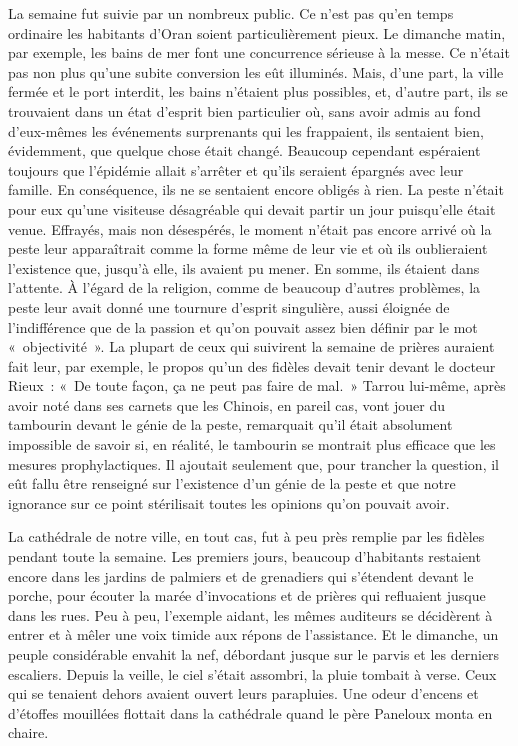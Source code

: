 \documentclass[french,twoside]{book} %
\begin{document}
La semaine fut suivie par un nombreux public. Ce n’est pas qu’en temps ordinaire les habitants d’Oran soient particulièrement pieux. Le dimanche matin, par exemple, les bains de mer font une concurrence sérieuse à la messe. Ce n’était pas non plus qu’une subite conversion les eût illuminés. Mais, d’une part, la ville fermée et le port interdit, les bains n’étaient plus possibles, et, d’autre part, ils se trouvaient dans un état d’esprit bien particulier où, sans avoir admis au fond d’eux-mêmes les événements surprenants qui les frappaient, ils sentaient bien, évidemment, que quelque chose était changé. Beaucoup cependant espéraient toujours que l’épidémie allait s’arrêter et qu’ils seraient épargnés avec leur famille. En conséquence, ils ne se sentaient encore obligés à rien. La peste n’était pour eux qu’une visiteuse désagréable qui devait partir un jour puisqu’elle était venue. Effrayés, mais non désespérés, le moment n’était pas encore arrivé où la peste leur apparaîtrait comme la forme même de leur vie et où ils oublieraient l’existence que, jusqu’à elle, ils avaient pu mener. En somme, ils étaient dans l’attente. À l’égard de la religion, comme de beaucoup d’autres problèmes, la peste leur avait donné une tournure d’esprit singulière, aussi éloignée de l’indifférence que de la passion et qu’on pouvait assez bien définir par le mot « objectivité ». La plupart de ceux qui suivirent la semaine de prières auraient fait leur, par exemple, le propos qu’un des fidèles devait tenir devant le docteur Rieux : « De toute façon, ça ne peut pas faire de mal. » Tarrou lui-même, après avoir noté dans ses carnets que les Chinois, en pareil cas, vont jouer du tambourin devant le génie de la peste, remarquait qu’il était absolument impossible de savoir si, en réalité, le tambourin se montrait plus efficace que les mesures prophylactiques. Il ajoutait seulement que, pour trancher la question, il eût fallu être renseigné sur l’existence d’un génie de la peste et que notre ignorance sur ce point stérilisait toutes les opinions qu’on pouvait avoir.\par
La cathédrale de notre ville, en tout cas, fut à peu près remplie par les fidèles pendant toute la semaine. Les premiers jours, beaucoup d’habitants restaient encore dans les jardins de palmiers et de grenadiers qui s’étendent devant le porche, pour écouter la marée d’invocations et de prières qui refluaient jusque dans les rues. Peu à peu, l’exemple aidant, les mêmes auditeurs se décidèrent à entrer et à mêler une voix timide aux répons de l’assistance. Et le dimanche, un peuple considérable envahit la nef, débordant jusque sur le parvis et les derniers escaliers. Depuis la veille, le ciel s’était assombri, la pluie tombait à verse. Ceux qui se tenaient dehors avaient ouvert leurs parapluies. Une odeur d’encens et d’étoffes mouillées flottait dans la cathédrale quand le père Paneloux monta en chaire.\par
\end{document}

